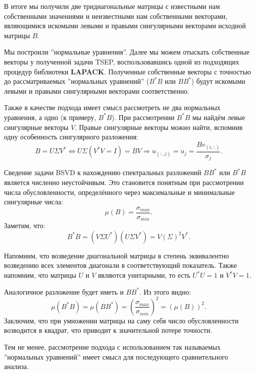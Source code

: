 В итоге мы получили две тридиагональные матрицы с известными нам собственными значениями и неизвестными нам собственными векторами, являющимися искомыми левыми и правыми сингулярными векторами исходной матрицы $B$.

Мы построили ''нормальные уравнения''. Далее мы можем отыскать собственные векторы у полученной задачи TSEP, воспользовавшись одной из подходящих процедур библиотеки \textbf{LAPACK}. Полученные собственные векторы с точностью до рассматриваемых ''нормальных уравнений'' (\(B^*B\) или \(BB^*\)) будут искомыми левыми и правыми сингулярными векторами соответственно.

Также в качестве подхода имеет смысл рассмотреть не два нормальных уравнения, а одно (к примеру, $B^*B$). При рассмотрении $B^*B$ мы найдём левые сингулярные векторы $V$. Правые сингулярные векторы можно найти, вспомнив одну особенность сингулярного разложения:
\begin{equation*}
     B=U \Sigma V^* \Leftrightarrow U\Sigma(V^*V=I)=BV \Rightarrow u_{(:,j)}=u_j= \frac{Bv_{(i,:)}}{\sigma_j}.
\end{equation*}


Сведение задачи BSVD к нахождению спектральных разложений \( B B^* \) или \( B^* B \) является численно неустойчивым. Это становится понятным при рассмотрении числа обусловленности, определённого через максимальные и минимальные сингулярные числа:
\[\mu(B) = \frac{\sigma_{max}}{\sigma_{min}}.\]
Заметим, что:
\[ B^*B=(V\Sigma U^*)(U \Sigma V^*)=V (\Sigma)^2 V^*. \]

\begin{note}
    Напомним, что возведение диагональной матрицы в степень эквивалентно возведению всех элементов диагонали в соответствующий показатель. Также напомним, что матрицы \(U\) и \(V\) являются унитарными, то есть \(U^*U=1\) и \(V^*V=1\).
\end{note}

Аналогичное разложение будет иметь и \(BB^*\). Из этого видно:
\[ \mu(B^*B) = \mu(BB^*) = \left( \frac{\sigma_{max}}{\sigma_{min}} \right)^2 =(\mu(B))^2.\]
Заключим, что при умножении матрицы на саму себя число обусловленности возводится в квадрат, что приводит к значительной потере точности. 

Тем не менее, рассмотрение подхода с использованием так называемых ''нормальных уравнений'' имеет смысл для последующего сравнительного анализа.

